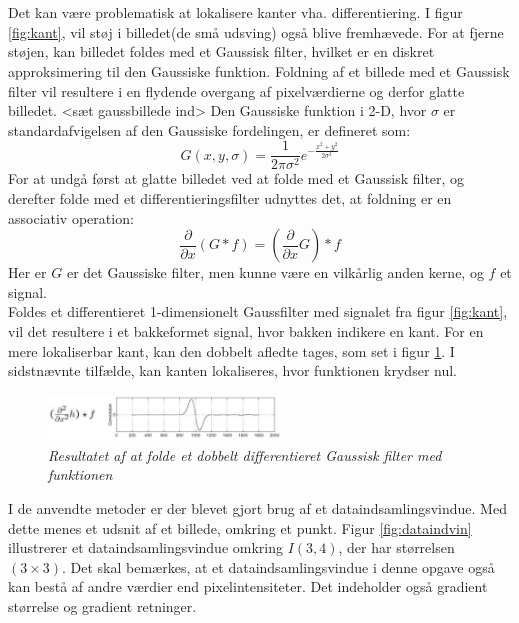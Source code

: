 \\
\\
Det kan være problematisk at lokalisere kanter vha. differentiering. I figur \ref{fig:kant}, vil støj i billedet(de små udsving) også blive fremhævede. For at fjerne støjen, kan billedet foldes med et Gaussisk filter, hvilket er en diskret approksimering til den Gaussiske funktion. Foldning af et billede med et Gaussisk filter vil resultere i en flydende overgang af pixelværdierne og derfor glatte billedet. <sæt gaussbillede ind> Den Gaussiske funktion i 2-D, hvor $ \sigma $ er standardafvigelsen af den Gaussiske fordelingen, er defineret som:
\begin{equation}
G(x,y,\sigma) = \frac{1}{2 \pi \sigma ^{2}} e^{- \frac{x^{2} + y^{2}}{2 \sigma ^{2}}}
\label{2dgaussian}
\end{equation} 
For at undgå først at glatte billedet ved at folde med et Gaussisk filter, og derefter folde med et differentieringsfilter udnyttes det, at foldning er en associativ operation:
\begin{equation}
\dfrac{\partial}{\partial x}(G \ast f) = (\dfrac{\partial}{\partial x}G) \ast f
\end{equation}
Her er $G$ er det Gaussiske filter, men kunne være en vilkårlig anden kerne, og $f$ et signal. 
\\
Foldes et differentieret 1-dimensionelt Gaussfilter med signalet fra figur \ref{fig:kant}, vil det resultere i et bakkeformet signal, hvor bakken indikere en kant. For en mere lokaliserbar kant, kan den dobbelt afledte tages, som set i figur \ref{fig:deriv}. I sidstnævnte tilfælde, kan kanten lokaliseres, hvor funktionen krydser nul.
\begin{figure}[H]
    \centering
    \includegraphics[width=0.55\textwidth]{fig/8.png}
    \vspace{-1em}   
    \begin{center}
    \caption{{\footnotesize \textit{
     Resultatet af at folde et dobbelt differentieret Gaussisk filter med funktionen}}}
    \label{fig:deriv}
     \end{center}
    \vspace{-2.5em}  
  \end{figure}
\noindent
I de anvendte metoder er der blevet gjort brug af et dataindsamlingsvindue. Med dette menes et udsnit af et billede, omkring et punkt. Figur \ref{fig:dataindvin} illustrerer et dataindsamlingsvindue omkring $I(3,4)$, der har størrelsen $(3 \times 3)$. Det skal bemærkes, at et dataindsamlingsvindue i denne opgave også kan bestå af andre værdier end pixelintensiteter. Det indeholder også gradient størrelse og gradient retninger.

